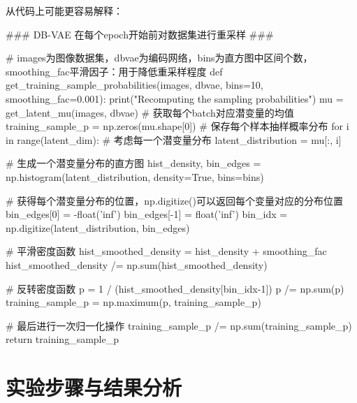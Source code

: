 \documentclass[12pt, a4paper, oneside]{ctexart}
\begin{document}
从代码上可能更容易解释：
\begin{pythoncode}
### DB-VAE 在每个epoch开始前对数据集进行重采样 ###

# images为图像数据集，dbvae为编码网络，bins为直方图中区间个数，smoothing_fac平滑因子：用于降低重采样程度
def get_training_sample_probabilities(images, dbvae, bins=10, smoothing_fac=0.001):
    print("Recomputing the sampling probabilities")
    mu = get_latent_mu(images, dbvae)  # 获取每个batch对应潜变量的均值
    training_sample_p = np.zeros(mu.shape[0])  # 保存每个样本抽样概率分布
    for i in range(latent_dim):  # 考虑每一个潜变量分布
        latent_distribution = mu[:, i]
        
        # 生成一个潜变量分布的直方图
        hist_density, bin_edges = np.histogram(latent_distribution, density=True, bins=bins)
        
        # 获得每个潜变量分布的位置，np.digitize()可以返回每个变量对应的分布位置
        bin_edges[0] = -float('inf')
        bin_edges[-1] = float('inf')
        bin_idx = np.digitize(latent_distribution, bin_edges)
        
        # 平滑密度函数
        hist_smoothed_density = hist_density + smoothing_fac
        hist_smoothed_density /= np.sum(hist_smoothed_density)
        
        # 反转密度函数
        p = 1 / (hist_smoothed_density[bin_idx-1])
        p /= np.sum(p)
        training_sample_p = np.maximum(p, training_sample_p)
        
    # 最后进行一次归一化操作
    training_sample_p /= np.sum(training_sample_p)
    return training_sample_p
\end{pythoncode}

\clearpage
\section{实验步骤与结果分析}
\end{document}
